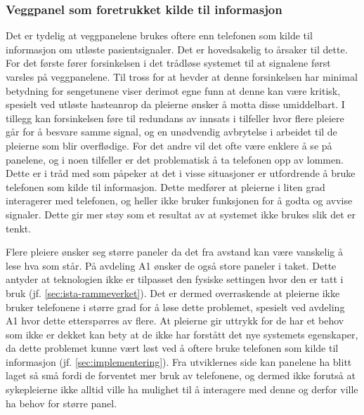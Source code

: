 \subsubsection{Veggpanel som foretrukket kilde til informasjon}
Det er tydelig at veggpanelene brukes oftere enn telefonen som kilde til informasjon om utløste pasientsignaler. Det er hovedsakelig to årsaker til dette. For det første fører forsinkelsen i det trådløse systemet til at signalene først varsles på veggpanelene. Til tross for at \citet{Sletten09} hevder at denne forsinkelsen har minimal betydning for sengetunene viser derimot egne funn at denne kan være kritisk, spesielt ved utløste hasteanrop da pleierne ønsker å motta disse umiddelbart. I tillegg kan forsinkelsen føre til redundans av innsats i tilfeller hvor flere pleiere går for å besvare samme signal, og en unødvendig avbrytelse i arbeidet til de pleierne som blir overflødige. For det andre vil det ofte være enklere å se på panelene, og i noen tilfeller er det problematisk å ta telefonen opp av lommen.  Dette er i tråd med \citet{klemets13} som påpeker at det i visse situasjoner er utfordrende å bruke telefonen som kilde til informasjon. Dette medfører at pleierne i liten grad interagerer med telefonen, og heller ikke bruker funksjonen for å godta og avvise signaler. Dette gir mer støy som et resultat av at systemet ikke brukes slik det er tenkt.

\noindent
Flere pleiere ønsker seg større paneler da det fra avstand kan være vanskelig å lese hva som står. På avdeling A1 ønsker de også store paneler i taket. Dette antyder at teknologien ikke er tilpasset den fysiske settingen hvor den er tatt i bruk (jf. \ref{sec:ista-rammeverket}). Det er dermed overraskende at pleierne ikke bruker telefonene i større grad for å løse dette problemet, spesielt ved avdeling A1 hvor dette etterspørres av flere. At pleierne gir uttrykk for de har et behov som ikke er dekket kan bety at de ikke har forstått det nye systemets egenskaper, da dette problemet kunne vært løst ved å oftere bruke telefonen som kilde til informasjon (jf. \ref{sec:implementering}). Fra utviklernes side kan panelene ha blitt laget så små fordi de forventet mer bruk av telefonene, og dermed ikke forutså at sykepleierne ikke alltid ville ha mulighet til å interagere med denne og derfor ville ha behov for større panel. 

